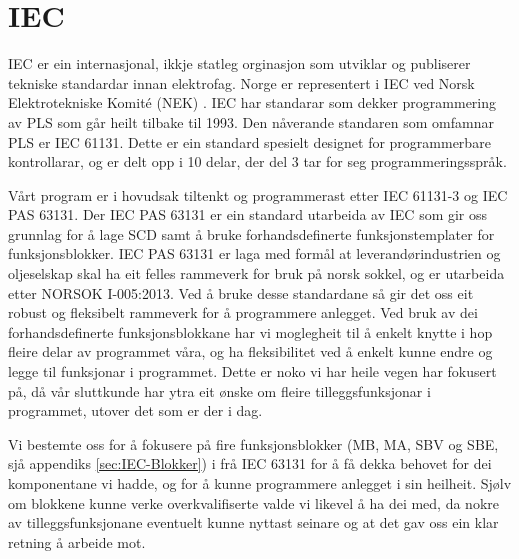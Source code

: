 \section{IEC}
\thispagestyle{fancy}
\label{sec:5.2}


\gls{IEC} \citep{IEC} er ein internasjonal, ikkje statleg orginasjon som utviklar og publiserer tekniske standardar innan elektrofag. 
Norge er representert i IEC ved Norsk Elektrotekniske Komité (NEK) \citep{IEC-SNL}. 
IEC har standarar som dekker programmering av PLS som går heilt tilbake til 1993\citep{Wiki-93}. 
Den nåverande standaren som omfamnar PLS er IEC 61131\citep{IEC-61131}. Dette er ein standard spesielt designet for programmerbare kontrollarar, og er delt opp i 10 delar, der del 3 tar for seg programmeringsspråk. 

Vårt program er i hovudsak tiltenkt og programmerast etter IEC 61131-3 og IEC \gls{PAS} 63131\citep{IEC-63131}. 
Der IEC PAS 63131 er ein standard utarbeida av IEC som gir oss grunnlag for å lage \gls{SCD} samt å bruke forhandsdefinerte funksjonstemplater for funksjonsblokker. 
IEC PAS 63131 er laga med formål at leverandørindustrien og oljeselskap skal ha eit felles rammeverk for bruk på norsk sokkel, og er utarbeida etter NORSOK I-005:2013.
Ved å bruke desse standardane så gir det oss eit robust og fleksibelt rammeverk for å programmere anlegget. 
Ved bruk av dei forhandsdefinerte funksjonsblokkane har vi moglegheit til å enkelt knytte i hop fleire delar av programmet våra, og ha fleksibilitet ved å enkelt kunne endre og legge til funksjonar i programmet. 
Dette er noko vi har heile vegen har fokusert på, då vår sluttkunde har ytra eit ønske om fleire tilleggsfunksjonar i programmet, utover det som er der i dag. 

Vi bestemte oss for å fokusere på fire funksjonsblokker (MB, MA, SBV og SBE, sjå appendiks \ref{sec:IEC-Blokker})  
i frå IEC 63131 for å få dekka behovet for dei komponentane vi hadde, og for å kunne programmere anlegget i sin heilheit.
Sjølv om blokkene kunne verke overkvalifiserte valde vi likevel å ha dei med, da nokre av tilleggsfunksjonane eventuelt kunne nyttast seinare
og at det gav oss ein klar retning å arbeide mot.
\newpage

